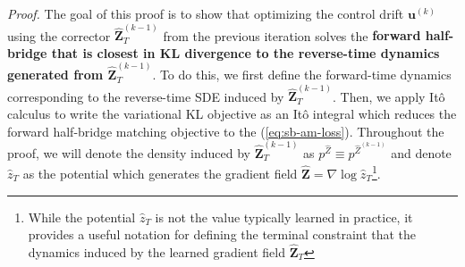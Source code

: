 \documentclass{article}
\begin{document}
\textit{Proof. }The goal of this proof is to show that optimizing the control drift $\boldsymbol{u}^{(k)}$ using the corrector $\widehat{\boldsymbol{Z}}_T^{(k-1)}$ from the previous iteration solves the \textbf{forward half-bridge that is closest in KL divergence to the reverse-time dynamics generated from $\widehat{\boldsymbol{Z}}_T^{(k-1)}$}. To do this, we first define the forward-time dynamics corresponding to the reverse-time SDE induced by $\widehat{\boldsymbol{Z}}_T^{(k-1)}$. Then, we apply Itô calculus to write the variational KL objective as an Itô integral which reduces the forward half-bridge matching objective to the (\ref{eq:sb-am-loss}). Throughout the proof, we will denote the density induced by $\widehat{\boldsymbol{Z}}_T^{(k-1)}$ as $p^{\widehat{Z}}\equiv p^{\widehat{Z}^{(k-1)}}$ and denote $\hat{z}_T$ as the potential which generates the gradient field  $\widehat{\boldsymbol{Z}}=\nabla \log \hat{z}_T$\footnote{While the potential $\hat{z}_T$ is not the value typically learned in practice, it provides a useful notation for defining the terminal constraint that the dynamics induced by the learned gradient field $\widehat{\boldsymbol{Z}}_T$}.
\end{document}
